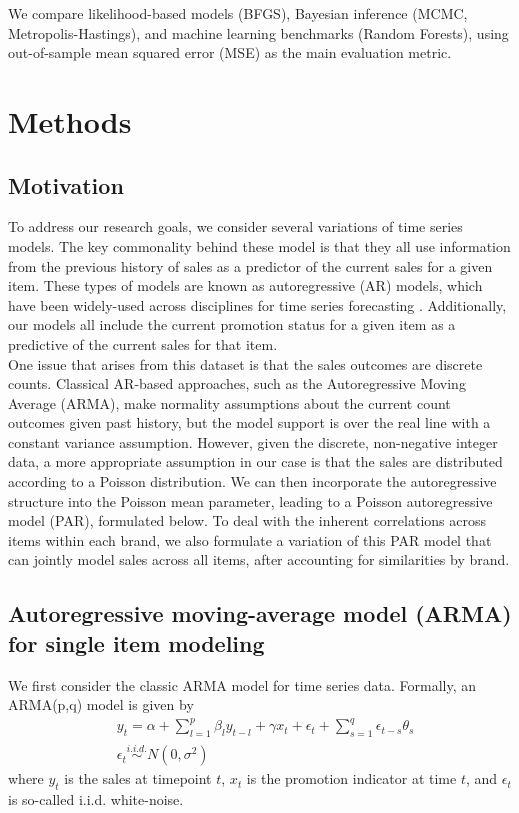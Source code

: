 \documentclass{article}
\begin{document}
\noindent We compare likelihood-based models (BFGS), Bayesian inference (MCMC, Metropolis-Hastings), and machine learning benchmarks (Random Forests), using out-of-sample mean squared error (MSE) as the main evaluation metric.

\section{Methods}

\subsection{Motivation}
To address our research goals, we consider several variations of time series models. The key commonality behind these model is that they all use information from the previous history of sales as a predictor of the current sales for a given item. These types of models are known as autoregressive (AR) models, which have been widely-used across disciplines for time series forecasting \citep{hamilton2020time}. Additionally, our models all include the current promotion status for a given item as a predictive of the current sales for that item. \\

\noindent One issue that arises from this dataset is that the sales outcomes are discrete counts. Classical AR-based approaches, such as the Autoregressive Moving Average (ARMA), make normality assumptions about the current count outcomes given past history, but the model support is over the real line with a constant variance assumption. However, given the discrete, non-negative integer data, a more appropriate assumption in our case is that the sales are distributed according to a Poisson distribution. We can then incorporate the autoregressive structure into the Poisson mean parameter, leading to a Poisson autoregressive model (PAR), formulated below. To deal with the inherent correlations across items within each brand, we also formulate a variation of this PAR model that can jointly model sales across all items, after accounting for similarities by brand.


\subsection{Autoregressive moving-average model (ARMA) for single item modeling}
\noindent We first consider the classic ARMA model for time series data. Formally, an ARMA(p,q) model is given by
\begin{align*}
    & y_t = \alpha + \sum_{l=1}^p\beta_l y_{t-l} + \gamma x_t+ \epsilon_t +\sum_{s=1}^q \epsilon_{t-s} \theta_{s}
    \\ &\epsilon_t\overset{i.i.d.}{\sim} N(0,\sigma^2)
\end{align*}
where $y_t$ is the sales at timepoint $t$, $x_t$ is the promotion indicator at time $t$, and $\epsilon_t$ is so-called i.i.d. white-noise.
\end{document}
